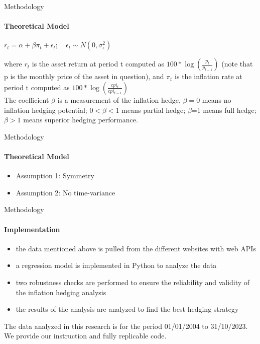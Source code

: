 \documentclass{beamer}
\begin{document}
\begin{frame}[fragile]{Methodology}
\framesubtitle{Theoretical Model}
\begin{center}
{\(r_t = \alpha + \beta \pi_t + \epsilon_t; \quad \epsilon_t \sim N(0, \sigma^2_{\epsilon})\)}
\end{center}
where \(r_t\) is the asset return at period t computed as \(100*\log\left(\frac{p_t}{p_{t-1}}\right)\)  (note that p is the monthly price of the asset in question), and $\pi_t$ is the inflation rate at period t computed as \(100*\log\left(\frac{cpi_t}{cpi_{t-1}}\right)\)\\[1em]
The coefficient \(\beta\) is a measurement of the inflation hedge, \(\beta=0\) means no inflation hedging potential; \(0<\beta<1\) means partial hedge; \(\beta\)=1 means full hedge; \(\beta>1\) means superior hedging performance.
\end{frame}

\begin{frame}[fragile]{Methodology}
\framesubtitle{Theoretical Model}
\begin{itemize}
\item Assumption 1: Symmetry
\item Assumption 2: No time-variance
\end{itemize}
\end{frame}

\begin{frame}[fragile]{Methodology}
\framesubtitle{Implementation}
\begin{itemize}
\item the data mentioned above is pulled from the different websites with web APIs
\item a regression model is implemented in Python to analyze the data
\item two robustness checks are performed to ensure the reliability and validity of the inflation hedging analysis
\item the results of the analysis are analyzed to find the best hedging strategy
\end{itemize}
The data analyzed in this research is for the period 01/01/2004 to 31/10/2023. We provide our instruction and fully replicable code. 
\end{frame}
\end{document}
